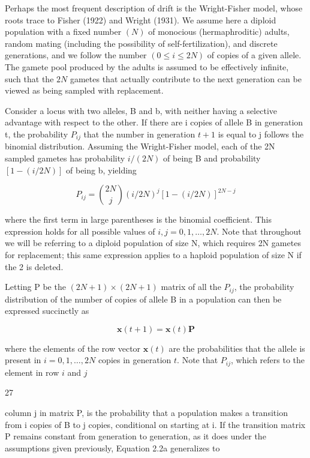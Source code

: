 \documentclass{article}
\begin{document}
Perhaps the most frequent description of drift is the Wright-Fisher model, whose roots trace to Fisher (1922) and Wright (1931). We assume here a diploid population with a fixed number  $ (N) $ of monocious (hermaphroditic) adults, random mating (including the possibility of self-fertilization), and discrete generations, and we follow the number  $ (0 \leq i \leq 2N) $ of copies of a given allele. The gamete pool produced by the adults is assumed to be effectively infinite, such that the  $ 2N $ gametes that actually contribute to the next generation can be viewed as being sampled with replacement.

Consider a locus with two alleles, B and b, with neither having a selective advantage with respect to the other. If there are i copies of allele B in generation t, the probability  $ P_{ij} $ that the number in generation  $ t+1 $ is equal to j follows the binomial distribution. Assuming the Wright-Fisher model, each of the 2N sampled gametes has probability  $ i/(2N) $ of being B and probability  $ [1-(i/2N)] $ of being b, yielding

\begin{equation}
P_{ij}=\binom{2N}{j}(i/2N)^{j}[1-(i/2N)]^{2N-j}
\tag{2.1}
\label{eq:2_1}
\end{equation}

where the first term in large parentheses is the binomial coefficient. This expression holds for all possible values of  $ i,j=0,1,\ldots,2N $. Note that throughout we will be referring to a diploid population of size N, which requires 2N gametes for replacement; this same expression applies to a haploid population of size N if the 2 is deleted.

Letting P be the  $ (2N+1)\times(2N+1) $ matrix of all the  $ P_{ij} $, the probability distribution of the number of copies of allele B in a population can then be expressed succinctly as

\begin{equation}
\mathbf{x}(t+1)=\mathbf{x}(t)\mathbf{P}
\tag{2.2a}
\label{eq:2_2a}
\end{equation}

where the elements of the row vector  $ \mathbf{x}(t) $ are the probabilities that the allele is present in  $ i = 0, 1, \ldots, 2N $ copies in generation  $ t $. Note that  $ P_{ij} $, which refers to the element in row  $ i $ and  $ j $

27

column j in matrix P, is the probability that a population makes a transition from i copies of B to j copies, conditional on starting at i. If the transition matrix P remains constant from generation to generation, as it does under the assumptions given previously, Equation 2.2a generalizes to
\end{document}
